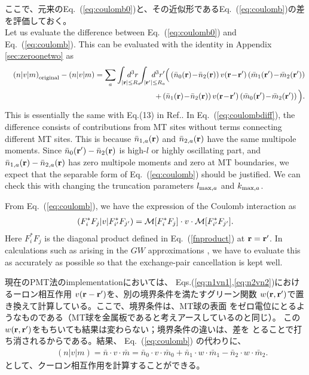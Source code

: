 \documentclass[twocolumn,showpacs,preprintnumbers,amsmath,amssymb,floatfix]{revtex4-1}
\newcommand{\bfr}{{\bf r}}
\newcommand{\req}[1]{\mbox{Eq.~\!(\ref{#1})}}
\def\MM{{\cal M}}
\def\inta{\int_{|\bfr|\leq R_a}\!\!\!\!\!\!\!\!\!\!\!\!}
\def\intad{\int_{|\bfr'|\leq R_a}\!\!\!\!\!\!\!\!\!\!\!\!}
\begin{document}
\begin{widetext}
ここで、元来の\req{eq:coulomb0}と、その近似形である\req{eq:coulomb}の差
を評価しておく。\\
Let us evaluate the difference between \req{eq:coulomb0} and \req{eq:coulomb}.
This can be evaluated with the identity in Appendix \ref{sec:zeroonetwo} as
\begin{eqnarray}
&&\left(n|v|m\right)_{\rm original}-\left(n|v|m\right)= 
\sum_a \inta d^3r \intad d^3r'\Big(
\left( \bar{n}_0(\bfr) \!-\! \bar{n}_2(\bfr) \right) 
v(\bfr\!-\!\bfr') \left( \bar{m}_1(\bfr')\!-\!\bar{m}_2(\bfr') \right)  \nonumber \\
&&+\left( \bar{n}_1(\bfr)\!-\!\bar{n}_2(\bfr) \right) 
v(\bfr\!-\!\bfr') \left( \bar{m}_0(\bfr')\!-\!\bar{m}_2(\bfr') \right)\Big).
\label{eq:coulombdiff}
\end{eqnarray}
This is essentially the same with Eq.(13) in Ref.\cite{kresse99}.  In
\req{eq:coulombdiff}, the difference consists of contributions from MT
sites without terms connecting different MT sites. This is because
$\bar{n}_{1,a}(\bfr)$ and $\bar{n}_{2,a}(\bfr)$ have the same multipole
moments.  Since $\bar{n}_0(\bfr') - \bar{n}_2(\bfr)$ is high-$l$ or
highly oscillating part, and $\bar{n}_{1,a}(\bfr)-\bar{n}_{2,a}(\bfr)$
has zero multipole moments and zero at MT boundaries, we expect that the
separable form of \req{eq:coulomb} should be justified. We can check
this with changing the truncation parameters $l_{{\rm max},a}$ and 
$k_{{\rm max},a}$.

From \req{eq:coulomb}, we have the expression of the Coulomb
interaction as
\begin{eqnarray}
\left(F^*_i F_j|v|F^*_{i'}F_{j'}\right) = \MM[F^*_iF_j] \cdot v \cdot \MM[F^*_{i'}F_{j'}].
\label{eq:ffvff}
\end{eqnarray}
Here $F^*_i F_j$ is the diagonal product defined in \req{fnproduct} at
$\bfr=\bfr'$.  In calculations such as arising in the $GW$
approximations \cite{kotani07a}, we have to evaluate this as accurately
as possible so that the exchange-pair cancellation is kept well.

現在のPMT法のimplementationにおいては、
Eqs.(\ref{eq:n1vn1},\ref{eq:n2vn2})におけるーロン相互作用
$v(\bfr-\bfr')$を、別の境界条件を満たすグリーン関数
$w(\bfr,\bfr')$で置き換えて計算している。ここで、境界条件は、MT球の表面
をゼロ電位にとるようなものである（MT球を金属板であると考えアースしているのと同じ）。
この$w(\bfr,\bfr')$をもちいても結果は変わらない；境界条件の違いは、差を
とることで打ち消されるからである。結果、
\req{eq:coulomb} の代わりに、
\begin{eqnarray}
&&\left(n|v|m\right)=\bar{n} \cdot v \cdot \bar{m} = 
\bar{n}_0 \cdot v \cdot \bar{m}_0 + \bar{n}_{1} \cdot w
\cdot \bar{m}_{1} - \bar{n}_{2} \cdot w \cdot \bar{m}_{2}. \label{eq:defnvm}
\end{eqnarray}
として、クーロン相互作用を計算することができる。



\end{widetext}
\end{document}
